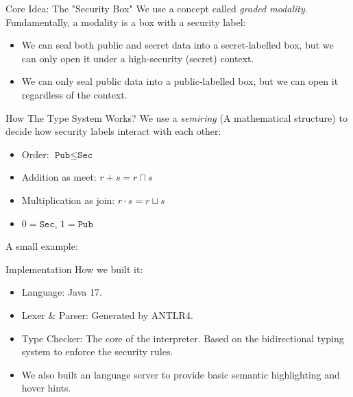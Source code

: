 \documentclass{beamer}
\begin{document}
\begin{frame}{Core Idea: The "Security Box"}
    We use a concept called \emph{graded modality}. Fundamentally, a modality is a box with a security label:
    \begin{itemize}
        \item We can seal both public and secret data into a secret-labelled box, but we can only open it under a high-security (secret) context.
        \item We can only seal public data into a public-labelled box, but we can open it regardless of the context.
    \end{itemize}
\end{frame}


\begin{frame}{How The Type System Works?}
    We use a \emph{semiring} (A mathematical structure) to decide how security labels interact with each other:
    \begin{itemize}
        \item Order: $\texttt{Pub}\le\texttt{Sec}$
        \item Addition as meet: $r+s=r\sqcap s$
        \item Multiplication as join: $r\cdot s=r\sqcup s$
        \item $0=\texttt{Sec}$, $1=\texttt{Pub}$
    \end{itemize}
    A small example:
    \examplesemiring
\end{frame}

\begin{frame}{Implementation}
    How we built it:
    \begin{itemize}
        \item Language: Java 17.
        \item Lexer \& Parser: Generated by ANTLR4.
        \item Type Checker: The core of the interpreter. Based on the bidirectional typing system to enforce the security rules.
        \item We also built an language server to provide basic semantic highlighting and hover hints.
    \end{itemize}
\end{frame}
\end{document}
